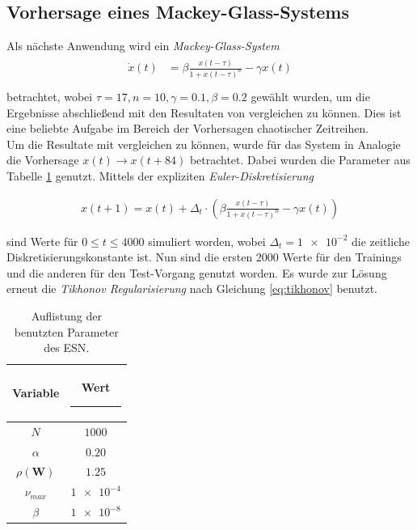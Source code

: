 \clearpage

\subsection{Vorhersage eines Mackey-Glass-Systems}
\label{sec:mackey_glass}
Als nächste Anwendung wird ein \textit{Mackey-Glass-System}
\begin{align}
\label{eq:application_mackey_glass_pde}
\begin{split}
\dot{x}(t) &= \beta \frac{x(t-\tau)}{1+x(t-\tau)^n}-\gamma x(t)\\
\end{split}
\end{align}
betrachtet, wobei $\tau = 17, n=10, \gamma=0.1, \beta = 0.2$ gewählt wurden, um die Ergebnisse abschließend mit den Resultaten von \citep{caraballo2014} vergleichen zu können. Dies ist eine beliebte Aufgabe im Bereich der Vorhersagen chaotischer Zeitreihen.\\
Um die Resultate mit \citep{caraballo2014} vergleichen zu können, wurde für das System in Analogie die Vorhersage $x(t) \rightarrow x(t+84)$ betrachtet. Dabei wurden die Parameter aus Tabelle \ref{tab:application_mackeyglass} genutzt. Mittels der expliziten \textit{Euler-Diskretisierung} 

\begin{align}
x(t+1) = x(t) + \Delta_t \cdot \left(\beta \frac{x(t-\tau)}{1+x(t-\tau)^n}-\gamma x(t)  \right)
\end{align}

sind Werte für $0 \leq t \leq 4000$ simuliert worden, wobei $\Delta_t=\num{1e-2}$ die zeitliche Diskretisierungskonstante ist. Nun sind die ersten $2000$ Werte für den Trainings und die anderen für den Test-Vorgang genutzt worden. Es wurde zur Lösung erneut die \textit{Tikhonov Regularisierung} nach Gleichung \ref{eq:tikhonov} benutzt.

\begin{table}[H]
	\centering
		\begin{tabular}{|c|c|}
		\rule[-1ex]{0pt}{3.5ex} Variable & \hspace{4ex} Wert \rule[-1ex]{4ex}{0pt}\\ 
		\hline \hline 
		\rule[-1ex]{0pt}{3.5ex} $N$ & $1000$ \\ 
		\hline 
		\rule[-1ex]{0pt}{3.5ex} $\alpha$ & $0.20$ \\ 
		\hline 
		\rule[-1ex]{0pt}{3.5ex} $\rho(\mathbf{W})$ & $1.25$ \\ 
		\hline 
		\rule[-1ex]{0pt}{3.5ex} $\nu_{max}$ & $\num{1e-4}$ \\ 
		\hline 
		\rule[-1ex]{0pt}{3.5ex} $\beta$ & $\num{1e-8}$ \\ 
		\hline 
	\end{tabular} 
	\caption{Auflistung der benutzten Parameter des \textsc{ESN}.}
\label{tab:application_mackeyglass}
\end{table}

